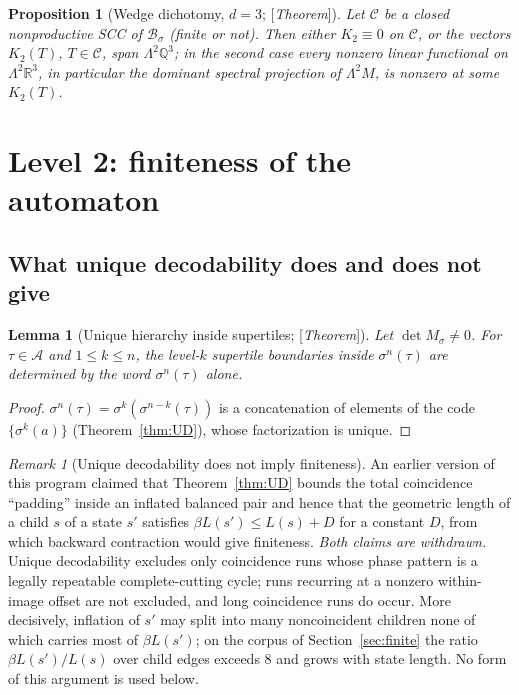 \documentclass[11pt]{amsart}
\theoremstyle{plain}
\newtheorem{lemma}[theorem]{Lemma}
\newtheorem{proposition}[theorem]{Proposition}
\theoremstyle{definition}
\theoremstyle{remark}
\newtheorem{remark}[theorem]{Remark}
\newcommand{\Q}{\mathbb{Q}}
\newcommand{\R}{\mathbb{R}}
\newcommand{\A}{\mathcal{A}}
\newcommand{\B}{\mathcal{B}}
\newcommand{\cC}{\mathcal{C}}
\newcommand{\Status}[1]{\textup{[\textit{#1}]}}
\begin{document}
\begin{proposition}[Wedge dichotomy, $d=3$; \Status{Theorem}]\label{prop:wedge-summary}
Let $\cC$ be a closed nonproductive SCC of $\B_\sigma$ (finite or not). Then either $K_2\equiv0$ on $\cC$, or the vectors $K_2(T)$, $T\in\cC$, span $\Lambda^2\Q^3$; in the second case every nonzero linear functional on $\Lambda^2\R^3$, in particular the dominant spectral projection of $\Lambda^2M$, is nonzero at some $K_2(T)$.
\end{proposition}

\section{Level 2: finiteness of the automaton}\label{sec:level2}

\subsection{What unique decodability does and does not give}

\begin{lemma}[Unique hierarchy inside supertiles; \Status{Theorem}]\label{lem:unique-hierarchy}
Let $\det M_\sigma\ne0$. For $\tau\in\A$ and $1\le k\le n$, the level-$k$ supertile boundaries inside $\sigma^n(\tau)$ are determined by the word $\sigma^n(\tau)$ alone.
\end{lemma}
\begin{proof}
$\sigma^n(\tau)=\sigma^k(\sigma^{n-k}(\tau))$ is a concatenation of elements of the code $\{\sigma^k(a)\}$ (Theorem~\ref{thm:UD}), whose factorization is unique.
\end{proof}

\begin{remark}[Unique decodability does not imply finiteness]\label{rem:UD-not-finiteness}
An earlier version of this program claimed that Theorem~\ref{thm:UD} bounds the total coincidence ``padding'' inside an inflated balanced pair and hence that the geometric length of a child $s$ of a state $s'$ satisfies $\beta L(s')\le L(s)+D$ for a constant $D$, from which backward contraction would give finiteness. \emph{Both claims are withdrawn.} Unique decodability excludes only coincidence runs whose phase pattern is a legally repeatable complete-cutting cycle; runs recurring at a nonzero within-image offset are not excluded, and long coincidence runs do occur. More decisively, inflation of $s'$ may split into many noncoincident children none of which carries most of $\beta L(s')$; on the corpus of Section~\ref{sec:finite} the ratio $\beta L(s')/L(s)$ over child edges exceeds $8$ and grows with state length. No form of this argument is used below.
\end{remark}
\end{document}
